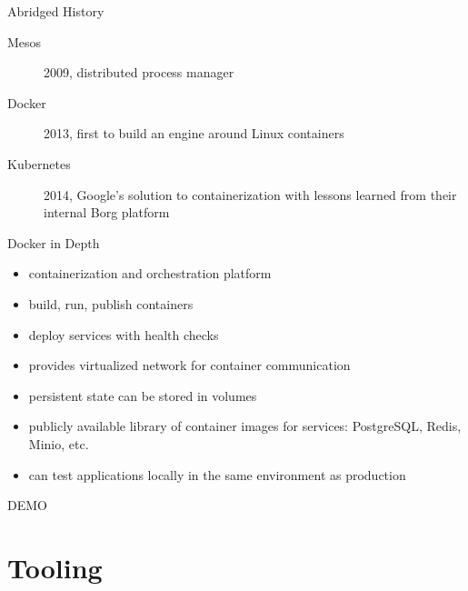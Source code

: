 \documentclass{beamer}
\begin{document}
\begin{frame}{Abridged History}
  \begin{description}
    \item[Mesos] 2009, distributed process manager
    \item[Docker] 2013, first to build an engine around Linux containers
    \item[Kubernetes] 2014, Google's solution to containerization with lessons
      learned from their internal Borg platform
  \end{description}
\end{frame}

\begin{frame}{Docker in Depth}
  \begin{itemize}
    \item containerization and orchestration platform
    \item build, run, publish containers
    \item deploy services with health checks
    \item provides virtualized network for container communication
    \item persistent state can be stored in volumes
    \item publicly available library of container images for services:
      PostgreSQL, Redis, Minio, etc.
    \item can test applications locally in the same environment as production
  \end{itemize}
\end{frame}

\begin{frame}
  \Huge DEMO
\end{frame}

\section{Tooling}
\end{document}
